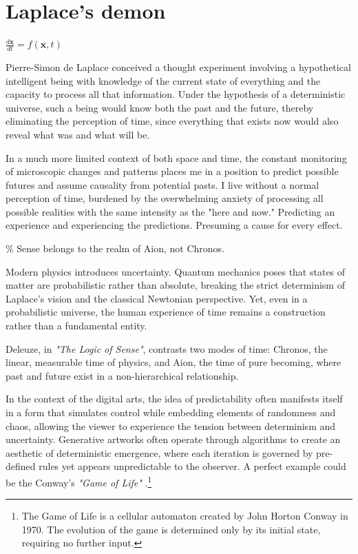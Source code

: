 \chapter*{Laplace's demon}
\begin{center}
\vspace{2cm}
\begin{flushright}
\large
\textit{$\frac{d\mathbf{x}}{dt} = f(\mathbf{x}, t)$ }
\end{flushright}
\vspace{2cm}
\end{center}
\normalsize

\newpage  %
Pierre-Simon de Laplace conceived a thought experiment involving a hypothetical intelligent being with knowledge of the current state of everything and the capacity to process all that information. Under the hypothesis of a deterministic universe, such a being would know both the past and the future, thereby eliminating the perception of time, since everything that exists now would also reveal what was and what will be.

In a much more limited context of both space and time, the constant monitoring of microscopic changes and patterns places me in a position to predict possible futures and assume causality from potential pasts. I live without a normal perception of time, burdened by the overwhelming anxiety of processing all possible realities with the same intensity as the "here and now." Predicting an experience and experiencing the predictions. Presuming a cause for every effect. 

{\scriptsize \textcolor{comment}{\% Sense belongs to the realm of Aion, not Chronos. }}

Modern physics introduces uncertainty. Quantum mechanics poses that states of matter are probabilistic rather than absolute, breaking the strict determinism of Laplace's vision and the classical Newtonian perspective. Yet, even in a probabilistic universe, the human experience of time remains a construction rather than a fundamental entity.

Deleuze, in \textit{"The Logic of Sense"}, contrasts two modes of time: Chronos, the linear, measurable time of physics, and Aion, the time of pure becoming, where past and future exist in a non-hierarchical relationship.\citep{deleuze1969}

In the context of the digital arts, the idea of predictability often manifests itself in a form that simulates control while embedding elements of randomness and chaos, allowing the viewer to experience the tension between determinism and uncertainty. Generative artworks often operate through algorithms to create an aesthetic of deterministic emergence, where each iteration is governed by pre-defined rules yet appears unpredictable to the observer. A perfect example could be the Conway's \textit{"Game of Life"} \citep{wiki:gol}.\footnote{The Game of Life is a cellular automaton created by John Horton Conway in 1970. The evolution of the game is determined only by its initial state, requiring no further input.}

